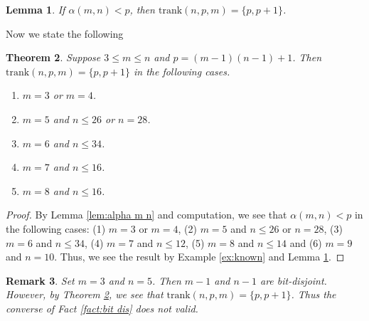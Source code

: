 \documentclass[a4paper,12pt]{article}
\newcommand{\trank}{{\mathrm{trank}}}
\newtheorem{thm}{Theorem}[section]
\newtheorem{lemma}[thm]{Lemma}
\newtheorem{remark}[thm]{Remark}
\begin{document}
\begin{lemma}
\label{lem:less than p}
If $\alpha(m,n)<p$, then $\trank(n,p,m)=\{p,p+1\}$.
\end{lemma}
%
%
Now we state the following


\begin{thm}
\label{thm:main}
Suppose $3\leq m\leq n$ and $p=(m-1)(n-1)+1$.
Then $\trank(n,p,m)=\{p,p+1\}$ in the following cases.
\begin{enumerate}
\item
$m=3$ or $m=4$.
\item
$m=5$ and $n\leq 26$ or $n=28$.
\item
$m=6$ and $n\leq 34$.
\item
$m=7$ and $n\leq 16$.
\item
$m=8$ and $n\leq 16$.
\end{enumerate}
\end{thm}
%
%
\begin{proof}
By Lemma \ref{lem:alpha m n} and computation, we see that $\alpha(m,n)<p$
in the following cases:
(1) $m=3$ or $m=4$,
(2) $m=5$ and $n\leq 26$ or $n=28$,
(3) $m=6$ and $n\leq 34$,
(4) $m=7$ and $n\leq 12$,
(5) $m=8$ and $n\leq 14$ and
(6) $m=9$ and $n=10$.
Thus, we see the result by Example \ref{ex:known} and Lemma \ref{lem:less than p}.
\end{proof}



\begin{remark}\rm
Set $m=3$ and $n=5$.
Then $m-1$ and $n-1$ are bit-disjoint.
However, by Theorem \ref{thm:main}, we see that 
$\trank(n,p,m)=\{p,p+1\}$.
Thus the converse of Fact \ref{fact:bit dis} does not valid.
\end{remark}
\end{document}
